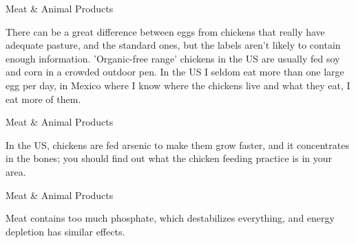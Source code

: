 \documentclass[11pt,oneside,openany,extrafontsizes]{memoir}
\begin{document}
\begin{standalonequote}{Meat \& Animal Products}

    \begin{answer}
        There can be a great difference between eggs from chickens that really have adequate pasture, and the standard ones, but the labels aren't likely to contain enough information. 'Organic-free range' chickens in the US are usually fed soy and corn in a crowded outdoor pen. In the US I seldom eat more than one large egg per day, in Mexico where I know where the chickens live and what they eat, I eat more of them.
    \end{answer}
\end{standalonequote}

\begin{standalonequote}{Meat \& Animal Products}

    \begin{answer}
        In the US, chickens are fed arsenic to make them grow faster, and it concentrates in the bones; you should find out what the chicken feeding practice is in your area.
    \end{answer}
\end{standalonequote}

\begin{standalonequote}{Meat \& Animal Products}

    \begin{answer}
        Meat contains too much phosphate, which destabilizes everything, and energy depletion has similar effects.
    \end{answer}
\end{standalonequote}
\end{document}
